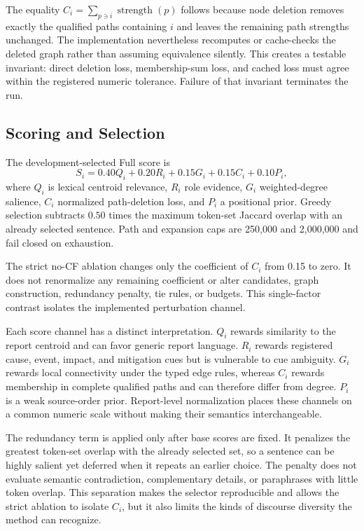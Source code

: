 \documentclass[applsci,article,submit,moreauthors]{Definitions/mdpi}
\begin{document}
The equality $C_i=\sum_{p\ni i}\operatorname{strength}(p)$ follows because node deletion removes exactly the qualified paths containing $i$ and leaves the remaining path strengths unchanged. The implementation nevertheless recomputes or cache-checks the deleted graph rather than assuming equivalence silently. This creates a testable invariant: direct deletion loss, membership-sum loss, and cached loss must agree within the registered numeric tolerance. Failure of that invariant terminates the run.

\subsection{Scoring and Selection}

The development-selected Full score is
\begin{equation}
S_i=0.40Q_i+0.20R_i+0.15G_i+0.15C_i+0.10P_i,
\end{equation}
where $Q_i$ is lexical centroid relevance, $R_i$ role evidence, $G_i$ weighted-degree salience, $C_i$ normalized path-deletion loss, and $P_i$ a positional prior. Greedy selection subtracts $0.50$ times the maximum token-set Jaccard overlap with an already selected sentence. Path and expansion caps are 250,000 and 2,000,000 and fail closed on exhaustion.

The strict no-CF ablation changes only the coefficient of $C_i$ from 0.15 to zero. It does not renormalize any remaining coefficient or alter candidates, graph construction, redundancy penalty, tie rules, or budgets. This single-factor contrast isolates the implemented perturbation channel.

Each score channel has a distinct interpretation. $Q_i$ rewards similarity to the report centroid and can favor generic report language. $R_i$ rewards registered cause, event, impact, and mitigation cues but is vulnerable to cue ambiguity. $G_i$ rewards local connectivity under the typed edge rules, whereas $C_i$ rewards membership in complete qualified paths and can therefore differ from degree. $P_i$ is a weak source-order prior. Report-level normalization places these channels on a common numeric scale without making their semantics interchangeable.

The redundancy term is applied only after base scores are fixed. It penalizes the greatest token-set overlap with the already selected set, so a sentence can be highly salient yet deferred when it repeats an earlier choice. The penalty does not evaluate semantic contradiction, complementary details, or paraphrases with little token overlap. This separation makes the selector reproducible and allows the strict ablation to isolate $C_i$, but it also limits the kinds of discourse diversity the method can recognize.
\end{document}
